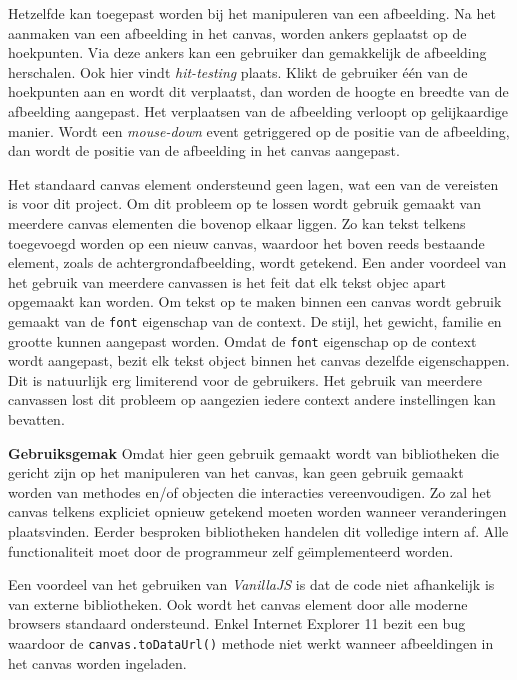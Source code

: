 Hetzelfde kan toegepast worden bij het manipuleren van een afbeelding. Na het aanmaken van een afbeelding in het canvas, worden ankers geplaatst op de hoekpunten. Via deze ankers kan een gebruiker dan gemakkelijk de afbeelding herschalen. Ook hier vindt \textit{hit-testing} plaats. Klikt de gebruiker \'{e}\'{e}n van de hoekpunten aan en wordt dit verplaatst, dan worden de hoogte en breedte van de afbeelding aangepast. Het verplaatsen van de afbeelding verloopt op gelijkaardige manier. Wordt een \textit{mouse-down} event getriggered op de positie van de afbeelding, dan wordt de positie van de afbeelding in het canvas aangepast. 


Het standaard canvas element ondersteund geen lagen, wat een van de vereisten is voor dit project. Om dit probleem op te lossen wordt gebruik gemaakt van meerdere canvas elementen die bovenop elkaar liggen. Zo kan tekst telkens toegevoegd worden op een nieuw canvas, waardoor het boven reeds bestaande element, zoals de achtergrondafbeelding, wordt getekend. Een ander voordeel van het gebruik van meerdere canvassen is het feit dat elk tekst objec apart opgemaakt kan worden. Om tekst op te maken binnen een canvas wordt gebruik gemaakt van de \texttt{font} eigenschap van de context. De stijl, het gewicht, familie en grootte kunnen aangepast worden. Omdat de \texttt{font} eigenschap op de context wordt aangepast, bezit elk tekst object binnen het canvas dezelfde eigenschappen. Dit is natuurlijk erg limiterend voor de gebruikers. Het gebruik van meerdere canvassen lost dit probleem op aangezien iedere context andere instellingen kan bevatten.  

\textbf{Gebruiksgemak} \break
Omdat hier geen gebruik gemaakt wordt van bibliotheken die gericht zijn op het manipuleren van het canvas, kan geen gebruik gemaakt worden van methodes en/of objecten die interacties vereenvoudigen. Zo zal het canvas telkens expliciet opnieuw getekend moeten worden wanneer veranderingen plaatsvinden. Eerder besproken bibliotheken handelen dit volledige intern af. Alle functionaliteit moet door de programmeur zelf ge\"{\i}mplementeerd worden. 

Een voordeel van het gebruiken van \textit{VanillaJS} is dat de code niet afhankelijk is van externe bibliotheken. Ook wordt het canvas element door alle moderne browsers standaard ondersteund. Enkel Internet Explorer 11 bezit een bug waardoor de  \texttt{canvas.toDataUrl()} methode niet werkt wanneer afbeeldingen in het canvas worden ingeladen. %

